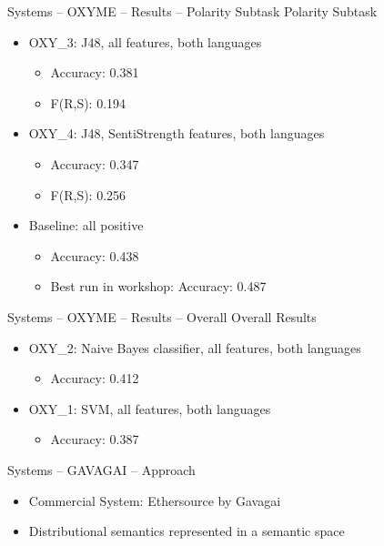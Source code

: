 \documentclass[12pt,a4paper]{beamer}
\begin{document}
\begin{frame}{Systems -- OXYME -- Results -- Polarity Subtask}
Polarity Subtask
\begin{itemize}
\item OXY\_3: J48, all features, both languages
  \begin{itemize}
  \item Accuracy: 0.381
  \item F(R,S): 0.194
  \end{itemize}
\item OXY\_4: J48, SentiStrength features, both languages
  \begin{itemize}
   \item Accuracy: 0.347
   \item F(R,S): 0.256
  \end{itemize}
\item Baseline: all positive
  \begin{itemize}
  \item Accuracy: 0.438
  \item Best run in workshop: Accuracy: 0.487
  \end{itemize}
\end{itemize}

\end{frame}

\begin{frame}{Systems -- OXYME -- Results -- Overall}
Overall Results
\begin{itemize}
 \item OXY\_2: Naive Bayes classifier, all features, both languages
  \begin{itemize}
  \item Accuracy: 0.412
  \end{itemize}
\item OXY\_1: SVM, all features, both languages
  \begin{itemize}
  \item Accuracy: 0.387
  \end{itemize}
\end{itemize}

\end{frame}

\begin{frame}{Systems -- GAVAGAI -- Approach}
\begin{itemize}
\item Commercial System: Ethersource by Gavagai
\item Distributional semantics represented in a semantic space
\end{itemize}

\end{frame}
\end{document}
